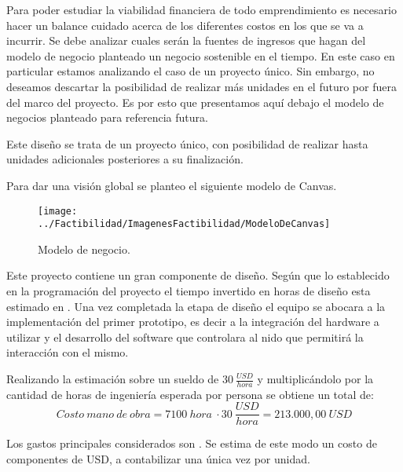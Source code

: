 Para poder estudiar la viabilidad financiera de todo emprendimiento es necesario hacer un balance cuidado acerca de los diferentes costos en los que se va a incurrir. Se debe analizar cuales serán la fuentes de ingresos que hagan del modelo de negocio planteado un negocio sostenible en el tiempo. 
En este caso en particular estamos analizando el caso de un proyecto único. Sin embargo, no deseamos descartar la posibilidad de realizar más unidades en el futuro por fuera del marco del proyecto. Es por esto que presentamos aquí debajo el modelo de negocios planteado para referencia futura. 

Este diseño se trata de un proyecto único, con posibilidad de realizar hasta \TBD unidades adicionales posteriores a su finalización.

Para dar una visión global se planteo el siguiente modelo de Canvas.
 

\begin{figure}[H]
	\centering
	\texttt{[image: ../Factibilidad/ImagenesFactibilidad/ModeloDeCanvas]}
	\caption{Modelo de negocio.}
	\label{fig:modelodecanvas}
\end{figure}



Este proyecto contiene un gran componente de diseño. Según que lo establecido en la programación del proyecto el tiempo invertido en horas de diseño esta estimado en  \TBD. 
Una vez completada la etapa de diseño el equipo se abocara a la implementación del primer prototipo, es decir a la integración del hardware a utilizar y el desarrollo del software que controlara al nido que permitirá la interacción con el mismo. 

Realizando la estimación sobre un sueldo de $30 \ \frac{USD}{hora}$ y multiplicándolo por la cantidad de horas de ingeniería esperada por persona se obtiene un total de: $$Costo \ mano \ de \ obra = 7100 \ hora \ \cdot 30 \ \frac{USD}{hora} = 213.000,00 \ USD$$



Los gastos principales considerados son \TBD. %
Se estima de este modo un costo de componentes de \TBD USD, a contabilizar una única vez por unidad.

